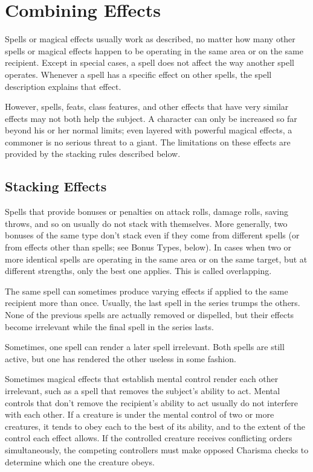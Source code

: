 \section{Combining Effects}
Spells or magical effects usually work as described, no matter how many other spells or magical effects happen to be operating in the same area or on the same recipient. Except in special cases, a spell does not affect the way another spell operates. Whenever a spell has a specific effect on other spells, the spell description explains that effect.

However, spells, feats, class features, and other effects that have very similar effects may not both help the subject. A character can only be increased so far beyond his or her normal limits; even layered with powerful magical effects, a commoner is no serious threat to a giant. The limitations on these effects are provided by the stacking rules described below.

\subsection{Stacking Effects}
Spells that provide bonuses or penalties on attack rolls, damage rolls, saving throws, and so on usually do not stack with themselves. More generally, two bonuses of the same type don't stack even if they come from different spells (or from effects other than spells; see Bonus Types, below).
 In cases when two or more identical spells are operating in the same area or on the same target, but at different strengths, only the best one applies. This is called overlapping.

 The same spell can sometimes produce varying effects if applied to the same recipient more than once. Usually, the last spell in the series trumps the others. None of the previous spells are actually removed or dispelled, but their effects become irrelevant while the final spell in the series lasts.

 Sometimes, one spell can render a later spell irrelevant. Both spells are still active, but one has rendered the other useless in some fashion.

 Sometimes magical effects that establish mental control render each other irrelevant, such as a spell that removes the subject's ability to act. Mental controls that don't remove the recipient's ability to act usually do not interfere with each other. If a creature is under the mental control of two or more creatures, it tends to obey each to the best of its ability, and to the extent of the control each effect allows. If the controlled creature receives conflicting orders simultaneously, the competing controllers must make opposed Charisma checks to determine which one the creature obeys.


